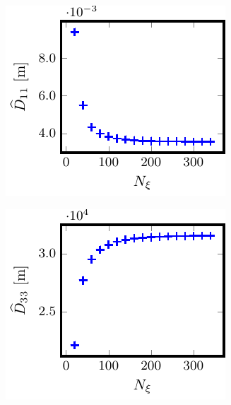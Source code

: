 \documentclass[10pt]{iopart}
\begin{document}
\begin{figure}[t]
	\centering
	\begin{subfigure}[t]{0.32\textwidth}
		\includegraphics{Convergence-Legendre-W7X-KJM-s0204-Er-3e-4-D11}
%		
		\caption{}
		\label{subfig:D11_convergence_Legendre_W7X_KJM_0204_Erho_3e-4}
	\end{subfigure}
	\begin{subfigure}[t]{0.32\textwidth}
		\includegraphics{Convergence-Legendre-W7X-KJM-s0204-Er-3e-4-D33}
%		
		\caption{}
		\label{subfig:D33_convergence_Legendre_W7X_KJM_0204_Erho_3e-4}
	\end{subfigure}
	

\end{figure}
\end{document}
